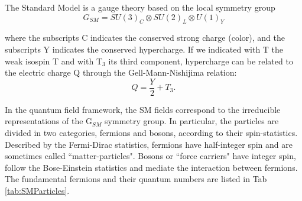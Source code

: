 The Standard Model is a gauge theory based on the local symmetry group
\begin{equation}
G_{SM} = SU(3)_C  \otimes SU(2)_L \otimes U(1)_Y
\label{eq:SMGroup}
\end{equation}

where the subscripts C indicates the conserved strong charge (color),   and the subscripts Y indicates the conserved hypercharge. 
If we indicated with T the weak isospin T and with T$_3$  its third component, hypercharge can be related to the electric charge Q through the Gell-Mann-Nishijima relation:
\begin{equation}
Q = \frac{Y}{2} + T_3.
\end{equation}



In the quantum field framework, the SM fields correspond to the irreducible representations of the G$_{SM}$ symmetry group. In particular, the particles are divided in two categories, fermions and bosons, according to their spin-statistics. Described by the Fermi-Dirac statistics, fermions have half-integer spin and are sometimes called ``matter-particles". Bosons or ``force carriers" have integer spin, follow the Bose-Einstein statistics and mediate the interaction between fermions. The fundamental fermions and their quantum numbers are listed in Tab \ref{tab:SMParticles}.

